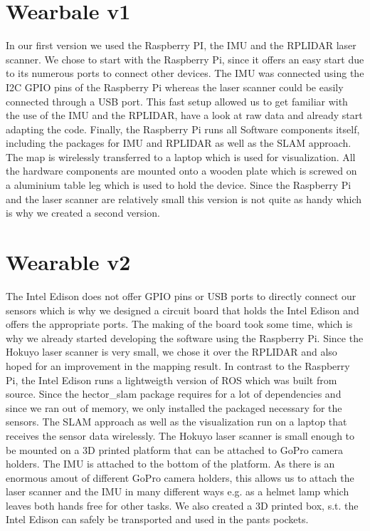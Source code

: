 \documentclass{sigchi-ext}
\begin{document}
\section{Wearbale v1}
In our first version we used the Raspberry PI, the IMU and the RPLIDAR laser scanner. We chose to start with the Raspberry Pi, since it offers an easy start due to its numerous ports to connect other devices. The IMU was connected using the I2C GPIO pins of the Raspberry Pi whereas the laser scanner could be easily connected through a USB port. This fast setup allowed us to get familiar with the use of the IMU and the RPLIDAR, have a look at raw data and already start adapting the code. Finally, the Raspberry Pi runs all Software components itself, including the packages for IMU and RPLIDAR as well as the SLAM approach. The map is wirelessly transferred to a laptop which is used for visualization. All the hardware components are mounted onto a wooden plate which is screwed on a aluminium table leg which is used to hold the device. Since the Raspberry Pi and the laser scanner are relatively small this version is not quite as handy which is why we created a second version.

\section{Wearable v2}
The Intel Edison does not offer GPIO pins or USB ports to directly connect our sensors which is why we designed a circuit board that holds the Intel Edison and offers the appropriate ports. The making of the board took some time, which is why we already started developing the software using the Raspberry Pi. Since the Hokuyo laser scanner is very small, we chose it over the RPLIDAR and also hoped for an improvement in the mapping result. In contrast to the Raspberry Pi, the Intel Edison runs a lightweigth version of ROS which was built from source. Since the hector\_slam package requires for a lot of dependencies and since we ran out of memory, we only installed the packaged necessary for the sensors. The SLAM approach as well as the visualization run on a laptop that receives the sensor data wirelessly. The Hokuyo laser scanner is small enough to be mounted on a 3D printed platform that can be attached to GoPro camera holders. The IMU is attached to the bottom of the platform. As there is an enormous amout of different GoPro camera holders, this allows us to attach the laser scanner and the IMU in many different ways e.g. as a helmet lamp which leaves both hands free for other tasks. We also created a 3D printed box, s.t. the Intel Edison can safely be transported and used in the pants pockets. 
\end{document}
